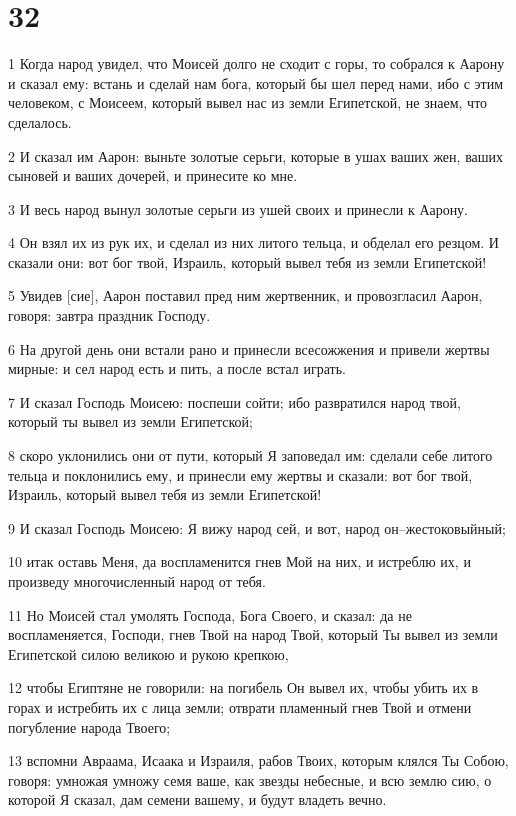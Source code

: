 \chapter{32}

\par 1 Когда народ увидел, что Моисей долго не сходит с горы, то собрался к Аарону и сказал ему: встань и сделай нам бога, который бы шел перед нами, ибо с этим человеком, с Моисеем, который вывел нас из земли Египетской, не знаем, что сделалось.
\par 2 И сказал им Аарон: выньте золотые серьги, которые в ушах ваших жен, ваших сыновей и ваших дочерей, и принесите ко мне.
\par 3 И весь народ вынул золотые серьги из ушей своих и принесли к Аарону.
\par 4 Он взял их из рук их, и сделал из них литого тельца, и обделал его резцом. И сказали они: вот бог твой, Израиль, который вывел тебя из земли Египетской!
\par 5 Увидев [сие], Аарон поставил пред ним жертвенник, и провозгласил Аарон, говоря: завтра праздник Господу.
\par 6 На другой день они встали рано и принесли всесожжения и привели жертвы мирные: и сел народ есть и пить, а после встал играть.
\par 7 И сказал Господь Моисею: поспеши сойти; ибо развратился народ твой, который ты вывел из земли Египетской;
\par 8 скоро уклонились они от пути, который Я заповедал им: сделали себе литого тельца и поклонились ему, и принесли ему жертвы и сказали: вот бог твой, Израиль, который вывел тебя из земли Египетской!
\par 9 И сказал Господь Моисею: Я вижу народ сей, и вот, народ он--жестоковыйный;
\par 10 итак оставь Меня, да воспламенится гнев Мой на них, и истреблю их, и произведу многочисленный народ от тебя.
\par 11 Но Моисей стал умолять Господа, Бога Своего, и сказал: да не воспламеняется, Господи, гнев Твой на народ Твой, который Ты вывел из земли Египетской силою великою и рукою крепкою,
\par 12 чтобы Египтяне не говорили: на погибель Он вывел их, чтобы убить их в горах и истребить их с лица земли; отврати пламенный гнев Твой и отмени погубление народа Твоего;
\par 13 вспомни Авраама, Исаака и Израиля, рабов Твоих, которым клялся Ты Собою, говоря: умножая умножу семя ваше, как звезды небесные, и всю землю сию, о которой Я сказал, дам семени вашему, и будут владеть вечно.
